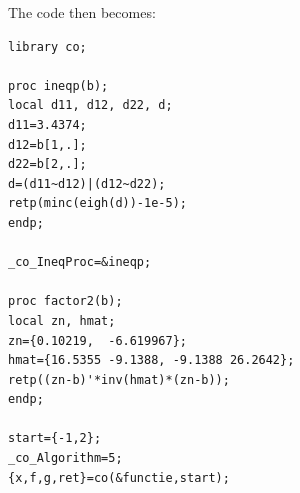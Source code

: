 \documentclass[useAMS,usenatbib,referee]{biom}
\begin{document}
The code then becomes:
\begin{verbatim}
library co;

proc ineqp(b);
local d11, d12, d22, d;
d11=3.4374;
d12=b[1,.];
d22=b[2,.];
d=(d11~d12)|(d12~d22);
retp(minc(eigh(d))-1e-5);
endp;

_co_IneqProc=&ineqp;

proc factor2(b);
local zn, hmat;
zn={0.10219,  -6.619967};
hmat={16.5355 -9.1388, -9.1388 26.2642};
retp((zn-b)'*inv(hmat)*(zn-b));
endp;

start={-1,2};
_co_Algorithm=5;
{x,f,g,ret}=co(&functie,start);
\end{verbatim}


\label{lastpage}
\end{document}

